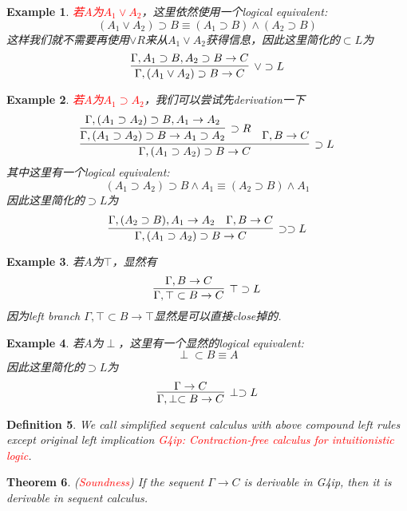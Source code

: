\documentclass{article}
\theoremstyle{plain}
\newtheorem{theorem}{Theorem}
\newtheorem{example}[theorem]{Example}
\newtheorem{definition}[theorem]{Definition}
\theoremstyle{nonumberplain}
\newcommand{\redt}[1]{\textcolor{red}{#1}}
\begin{document}
\begin{example}
\rm \redt{若$A$为$A_1 \vee A_2$}，这里依然使用一个logical equivalent:
$$
(A_1 \vee A_2) \supset B  \equiv (A_1 \supset B) \wedge (A_2 \supset B)
$$
这样我们就不需要再使用$\vee R$来从$A_1 \vee A_2$获得信息，因此这里简化的$\subset L$为
$$
\infer[\vee \supset L]{\Gamma, (A_1 \vee A_2) \supset B  \to C}{\Gamma, A_1 \supset B, A_2 \supset B \to C}
$$
\end{example}

\begin{example}
\rm \redt{若$A$为$A_1 \supset A_2$}，我们可以尝试先derivation一下
$$
\infer[\supset L]{\Gamma,(A_1 \supset A_2) \supset B \to C}{\infer[\supset R]{\Gamma,(A_1 \supset A_2) \supset B \to A_1 \supset A_2}{\Gamma,(A_1 \supset A_2) \supset B, A_1 \to A_2} & \Gamma, B \to C}
$$
其中这里有一个logical equivalent:
$$
(A_1 \supset A_2) \supset B  \wedge A_1 \equiv (A_2 \supset B) \wedge A_1
$$
因此这里简化的$\supset L$为
$$
\infer[\supset\supset L]{\Gamma,(A_1 \supset A_2) \supset B \to C}{\Gamma, (A_2 \supset B), A_1 \to A_2 & \Gamma, B \to C}
$$
\end{example}

\begin{example}
\rm 若$A$为$\top$，显然有
$$
\infer[\top \supset L]{\Gamma, \top \subset B \to C}{\Gamma, B \to C}
$$
因为left branch $\Gamma, \top \subset B \to \top$显然是可以直接close掉的. 
\end{example}

\begin{example}
\rm 若$A$为$\perp$，这里有一个显然的logical equivalent:
$$
\perp \subset B \equiv A
$$
因此这里简化的$\supset L$为
$$
\infer[\perp \supset L]{\Gamma, \perp \subset B \to C}{\Gamma \to C}
$$
\end{example}

\begin{definition}
\rm We call simplified sequent calculus with above compound left rules except original left implication \redt{G4ip: Contraction-free calculus for intuitionistic logic}.
\end{definition}

\begin{theorem}
\rm (\redt{Soundness}) If the sequent $\Gamma \to C$ is derivable in G4ip, then it is derivable in sequent calculus.
\end{theorem}
\end{document}
